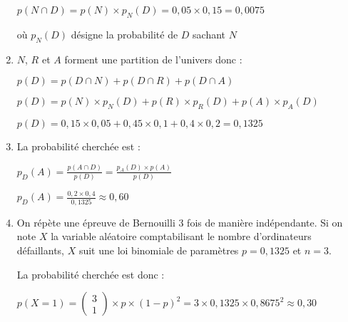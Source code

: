 \begin{corrige}
\begin{enumerate}
          $p\left(N \cap  D\right)=p\left(N\right)\times p_{N}\left(D\right)=0,05\times 0,15=0,0075$
          \par
          où $p_{N}\left(D\right)$ désigne la probabilité de $D$ sachant $N$
          \item
          $N$, $R$ et $A$ forment une partition de l'univers donc :
          \par
          $p\left(D\right)=p\left(D \cap  N\right)+p\left(D \cap  R\right)+p\left(D \cap  A\right)$
          \par
          $p\left(D\right)=p\left(N\right)\times p_{N}\left(D\right)+p\left(R\right)\times p_{R}\left(D\right)+p\left(A\right)\times p_{A}\left(D\right)$
          \par
          $p\left(D\right)=0,15\times 0,05+0,45\times 0,1+ 0,4\times 0,2=0,1325$
          \item
          La probabilité cherchée est :
          \par
          $p_{D}\left(A\right)=\frac{p\left(A \cap  D\right)}{p\left(D\right)}=\frac{p_{A}\left(D\right)\times p\left(A\right)}{p\left(D\right)}$
          \par
          $p_{D}\left(A\right)=\frac{0,2\times 0,4}{0,1325}\approx 0,60$
          \item
          On répète une épreuve de Bernouilli 3 fois de manière indépendante. Si on note $X$ la variable aléatoire comptabilisant le nombre d'ordinateurs défaillants, $X$ suit une loi binomiale de paramètres $p=0,1325$ et $n=3$.
          \par
          La probabilité cherchée est donc :
          \par
          $p\left(X=1\right)=\begin{pmatrix} 3 \\ 1 \end{pmatrix}\times p\times \left(1-p\right)^{2}=3\times 0,1325\times 0,8675^{2}\approx 0,30$
     \end{enumerate}
\end{corrige}
